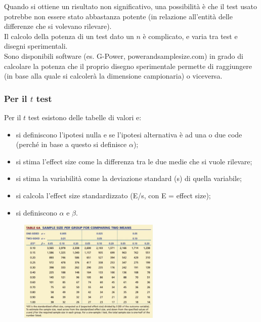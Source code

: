 \documentclass[10pt, draft]{book}
\newcommand{\tightlist}{%
\setlength{\itemsep}{1pt}\setlength{\parskip}{0pt}\setlength{\parsep}{0pt}}
\begin{document}
Quando si ottiene un risultato non significativo, una possibilità è che il test usato potrebbe non essere stato abbastanza potente (in relazione all'entità delle differenze che si volevano rilevare).\\

Il calcolo della potenza di un test dato un $n$ è complicato, e varia tra test e disegni sperimentali.\\
Sono disponibili software (es. G-Power, powerandsamplesize.com) in grado di calcolare la potenza che il proprio disegno sperimentale permette di raggiungere (in base alla quale si calcolerà la dimensione campionaria) o viceversa.\\

\subsubsection{Per il \texorpdfstring{$t$}{Lg} test}

Per il $t$ test esistono delle tabelle di valori e:
\begin{itemize}\tightlist
    \item si definiscono l'ipotesi nulla e se l'ipotesi alternativa è ad una o due code (perché in base a questo si definisce $\alpha$);
    \item si stima l'effect size come la differenza tra le due medie che si vuole rilevare;
    \item si stima la variabilità come la deviazione standard (s) di quella variabile;
    \item si calcola l'effect size standardizzato (E/s, con E = effect size);
    \item si definiscono $\alpha$ e $\beta$.
\end{itemize}

\begin{figure}[H]
    \centering
    \includegraphics[width=0.6\textwidth]{samplesizet}
    \caption{\small{}}
    \label{samplesizet}
\end{figure}
\end{document}
